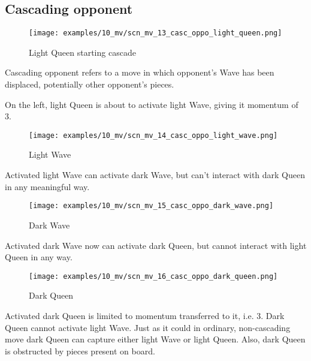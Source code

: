 \clearpage %

\subsection*{Cascading opponent}

\noindent
\begin{wrapfigure}[10]{l}{0.5625\textwidth}
\centering
\texttt{[image: examples/10\_mv/scn\_mv\_13\_casc\_oppo\_light\_queen.png]}
\caption{Light Queen starting cascade}
\label{fig:scn_mv_13_casc_oppo_light_queen}
\end{wrapfigure}
Cascading opponent refers to a move in which opponent's Wave has been displaced,
potentially other opponent's pieces.

On the left, light Queen is about to activate light Wave, giving it momentum of 3.

\vspace*{0.155\textheight}
\noindent
\begin{wrapfigure}[5]{r}{0.5625\textwidth}
\centering
\texttt{[image: examples/10\_mv/scn\_mv\_14\_casc\_oppo\_light\_wave.png]}
\caption{Light Wave}
\label{fig:scn_mv_14_casc_oppo_light_wave}
\end{wrapfigure}
Activated light Wave can activate dark Wave, but can't interact with dark Queen in
any meaningful way.

\clearpage %

\noindent
\begin{wrapfigure}[5]{l}{0.5625\textwidth}
\centering
\texttt{[image: examples/10\_mv/scn\_mv\_15\_casc\_oppo\_dark\_wave.png]}
\caption{Dark Wave}
\label{fig:scn_mv_15_casc_oppo_dark_wave}
\end{wrapfigure}
Activated dark Wave now can activate dark Queen, but cannot interact with light Queen
in any way.

\vspace*{0.315\textheight}
\noindent
\begin{wrapfigure}[13]{r}{0.5625\textwidth}
\centering
\texttt{[image: examples/10\_mv/scn\_mv\_16\_casc\_oppo\_dark\_queen.png]}
\caption{Dark Queen}
\label{fig:scn_mv_16_casc_oppo_dark_queen}
\end{wrapfigure}
Activated dark Queen is limited to momentum transferred to it, i.e. 3. Dark Queen
cannot activate light Wave. Just as it could in ordinary, non-cascading move dark
Queen can capture either light Wave or light Queen. Also, dark Queen is obstructed
by pieces present on board.

